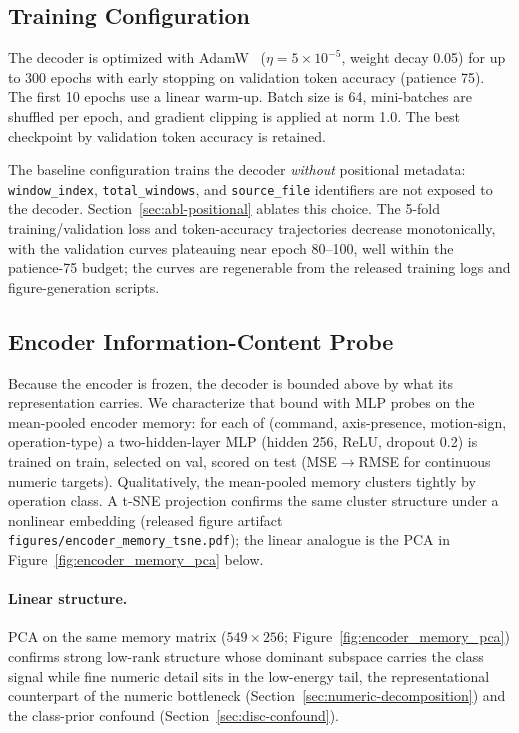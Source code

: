 \documentclass[sensors,article,submit,moreauthors,pdftex]{Definitions/mdpi}
\begin{document}
\subsection{Training Configuration}
\label{sec:training}

The decoder is optimized with AdamW~\cite{loshchilov2019adamw} ($\eta = 5 \times 10^{-5}$, weight decay 0.05) for up to 300 epochs with early stopping on validation token accuracy (patience 75). The first 10 epochs use a linear warm-up. Batch size is 64, mini-batches are shuffled per epoch, and gradient clipping is applied at norm 1.0. The best checkpoint by validation token accuracy is retained.

The baseline configuration trains the decoder \emph{without} positional metadata: \texttt{window\_index}, \texttt{total\_windows}, and \texttt{source\_file} identifiers are not exposed to the decoder. Section~\ref{sec:abl-positional} ablates this choice. The 5-fold training/validation loss and token-accuracy trajectories decrease monotonically, with the validation curves plateauing near epoch 80--100, well within the patience-75 budget; the curves are regenerable from the released training logs and figure-generation scripts.

\subsection{Encoder Information-Content Probe}
\label{sec:encoder-probe}

Because the encoder is frozen, the decoder is bounded above by what its representation carries. We characterize that bound with MLP probes on the mean-pooled encoder memory: for each of (command, axis-presence, motion-sign, operation-type) a two-hidden-layer MLP (hidden 256, ReLU, dropout 0.2) is trained on train, selected on val, scored on test (MSE$\to$RMSE for continuous numeric targets). Qualitatively, the mean-pooled memory clusters tightly by operation class. A t-SNE projection confirms the same cluster structure under a nonlinear embedding (released figure artifact \texttt{figures/encoder\_memory\_tsne.pdf}); the linear analogue is the PCA in Figure~\ref{fig:encoder_memory_pca} below.

\paragraph{Linear structure.} PCA on the same memory matrix ($549 \times 256$; Figure~\ref{fig:encoder_memory_pca}) confirms strong low-rank structure whose dominant subspace carries the class signal while fine numeric detail sits in the low-energy tail, the representational counterpart of the numeric bottleneck (Section~\ref{sec:numeric-decomposition}) and the class-prior confound (Section~\ref{sec:disc-confound}).
\end{document}
